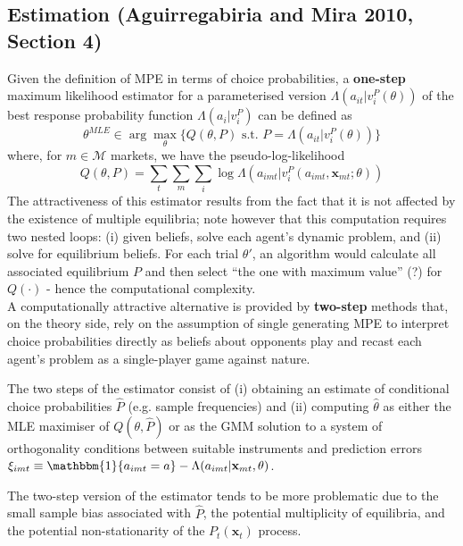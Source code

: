\documentclass[11pt]{article}
\begin{document}
\subsection{Estimation (Aguirregabiria and Mira 2010, Section 4)}

Given the definition of MPE in terms of choice probabilities, a \textbf{one-step} maximum likelihood estimator for a parameterised version $\Lambda(a_{it} | v^P_i(\theta))$ of the best response probability function $\Lambda(a_i | v^P_i)$ can be defined as
\begin{equation}
	\theta^{MLE} \in \arg\max_\theta \{Q(\theta, P) \text{ s.t. } P = \Lambda(a_{it} | v^P_i(\theta))\}
\end{equation}
where, for $m \in \mathscr{M}$ markets, we have the pseudo-log-likelihood
\begin{equation}
	Q(\theta, P) = \sum_t \sum_m \sum_i \log \Lambda(a_{imt} | v^P_i(a_{imt}, \mathbf{x}_{mt}; \theta))
\end{equation}
The attractiveness of this estimator results from the fact that it is not affected by the existence of multiple equilibria; note however that this computation requires two nested loops: (i) given beliefs, solve each agent's dynamic problem, and (ii) solve for equilibrium beliefs.
For each trial $\theta'$, an algorithm would calculate all associated equilibrium $P$ and then select ``the one with maximum value'' (?) for $Q(\cdot)$ - hence the computational complexity. \\

A computationally attractive alternative is provided by \textbf{two-step} methods that, on the theory side, rely on the assumption of single generating MPE to interpret choice probabilities directly as beliefs about opponents play and recast each agent's problem as a single-player game against nature.

The two steps of the estimator consist of (i) obtaining an estimate of conditional choice probabilities $\hat{P}$ (e.g. sample frequencies) and (ii) computing $\hat{\theta}$ as either the MLE maximiser of $Q(\theta, \hat{P})$ or as the GMM solution to a system of orthogonality conditions between suitable instruments and prediction errors $\xi_{imt} \equiv \mathbbm{1}\{a_{imt} = a\} - \Lambda(a_{imt} | \mathbf{x}_{mt}, \theta)$.

The two-step version of the estimator tends to be more problematic due to the small sample bias associated with $\hat{P}$, the potential multiplicity of equilibria, and the potential non-stationarity of the $P_t(\mathbf{x}_t)$ process.
\end{document}
